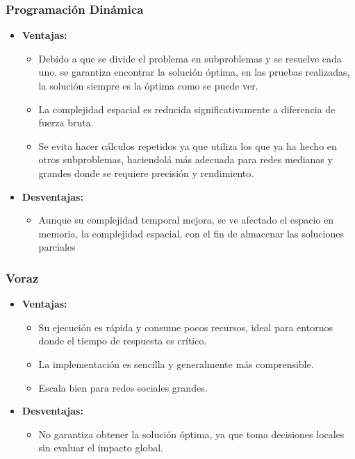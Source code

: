 \documentclass[11pt,letter]{article}
\begin{document}
    \subsubsection{Programación Dinámica}

    \begin{itemize}
        \item \textbf{Ventajas:}
        \begin{itemize}
            \item  Debido a que se divide el problema en subproblemas y se resuelve cada uno, se garantiza encontrar la solución óptima, en las pruebas realizadas, la solución siempre es la óptima como se puede ver.
            \item  La complejidad espacial es reducida significativamente a diferencia de fuerza bruta.
            \item Se evita hacer cálculos repetidos ya que utiliza los que ya ha hecho en otros subproblemas, haciendolá más adecuada para redes medianas y grandes donde se requiere precisión y rendimiento.
        \end{itemize}
        \item \textbf{Desventajas:}
        \begin{itemize}
            \item  Aunque su complejidad temporal mejora, se ve afectado el espacio en memoria, la complejidad espacial, con el fin de almacenar las soluciones parciales
        \end{itemize}
    \end{itemize}

    \subsubsection{Voraz}

    \begin{itemize}
        \item \textbf{Ventajas:}
        \begin{itemize}
            \item  Su ejecución es rápida y consume pocos recursos, ideal para entornos donde el tiempo de respuesta es crítico.
            \item  La implementación es sencilla y generalmente más comprensible.
            \item Escala bien para redes sociales grandes.
        \end{itemize}
        \item \textbf{Desventajas:}
        \begin{itemize}
            \item  No garantiza obtener la solución óptima, ya que toma decisiones locales sin evaluar el impacto global.
        \end{itemize}
    \end{itemize}
\end{document}
